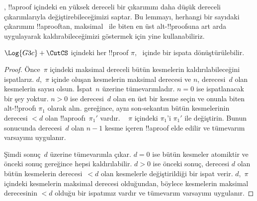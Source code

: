 , !!a{proof} içindeki en yüksek dereceli bir
\CutCS{} çıkarımını daha düşük dereceli \CutCS{} çıkarımlarıyla
değiştirebileceğimizi saptar. Bu lemmayı, herhangi bir sayıdaki \CutCS{}
çıkarımını !!a{proof}{}tan, maksimal~\CutCS{} ile biten en üst
alt-!!{proof}s{}ına art arda uygulayarak kaldırabileceğimizi göstermek için
yine kullanabiliriz.

\begin{thm}
$\Log{G3c} + \CutCS$ içindeki her !!{proof} $\pi$,~ içinde bir
ispata dönüştürülebilir.
\end{thm}

\begin{proof}
  Önce~$\pi$ içindeki maksimal dereceli bütün kesmelerin
  kaldırılabileceğini ispatlarız. $d$,~$\pi$ içinde oluşan kesmelerin
  maksimal derecesi ve $n$, derecesi~$d$ olan kesmelerin sayısı olsun.
  İspat~$n$ üzerine tümevarımladır. $n=0$ ise ispatlanacak bir şey yoktur.
  $n>0$ ise derecesi~$d$ olan en üst bir kesme seçin ve onunla biten
  alt-!!{proof}{}ı $\pi_1$ olarak alın.  gereğince,
  aynı son-sekantın bütün kesmelerinin derecesi $<d$ olan
  !!a{proof}{}ı~$\pi_1'$ vardır. ~ $\pi$ içindeki $\pi_1$'i $\pi_1'$ ile
  değiştirin. Bunun sonucunda derecesi~$d$ olan $n-1$ kesme içeren
  !!a{proof} elde edilir ve tümevarım varsayımı uygulanır.

  Şimdi sonuç~$d$ üzerine tümevarımla çıkar. $d=0$ ise bütün kesmeler
  atomiktir ve önceki sonuç gereğince hepsi kaldırılabilir. $d>0$ ise
  önceki sonuç, derecesi $d$ olan bütün kesmelerin derecesi~$<d$ olan
  kesmelerle değiştirildiği bir ispat verir. $d$,~$\pi$ içindeki kesmelerin
  maksimal derecesi olduğundan, böylece kesmelerin maksimal derecesinin
  $<d$ olduğu bir ispatımız vardır ve tümevarım varsayımı uygulanır.
\end{proof}

